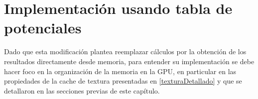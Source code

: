 
\section{Implementación usando tabla de potenciales}

% 



Dado que esta modificación plantea reemplazar cálculos por la obtención de los resultados directamente desde memoria, 
para entender su implementación se debe hacer foco en la organización de la memoria en la GPU, en particular en las propiedades de la cache de textura presentadas en \ref{texturaDetallado} y que se detallaron en las secciones previas de este capítulo.





